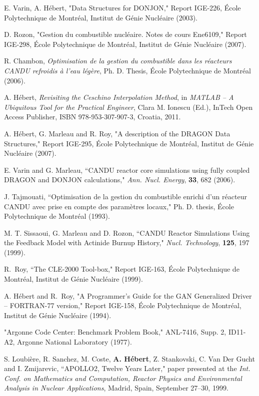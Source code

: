 \begin{thebibliography}{99}
E. Varin, A. H\'ebert,
"Data Structures for DONJON," 
Report IGE-226, \'Ecole Polytechnique de Montr\'eal,
 Institut de G\'enie Nucl\'eaire (2003).

D. Rozon, 
"Gestion du combustible nucl\'eaire. Notes de cours Ene6109,"
Report IGE-298, \'Ecole Polytechnique de Montr\'eal,
 Institut de G\'enie Nucl\'eaire (2007).

R. Chambon,
{\sl Optimisation de la gestion du combustible dans les r\'eacteurs
CANDU refroidis \`a l'eau l\'eg\`ere}, Ph. D. Thesis, \'Ecole Polytechnique de Montr\'eal (2006). 

A. H\'ebert, {\sl Revisiting the Ceschino Interpolation Method}, in {\sl MATLAB -- A Ubiquitous Tool for the Practical
Engineer}, Clara M. Ionescu (Ed.), InTech Open Access Publisher, ISBN 978-953-307-907-3, Croatia, 2011.

A. H\'ebert, G. Marleau and R. Roy, 
"A description of the DRAGON Data Structures," 
Report IGE-295, \'Ecole Polytechnique de Montr\'eal,
 Institut de G\'enie Nucl\'eaire (2007).

E. Varin and G. Marleau, ``CANDU reactor core simulations using fully coupled DRAGON and DONJON calculations,"
{\sl Ann. Nucl. Energy}, {\bf 33}, 682 (2006).

J. Tajmouati, ``Optimisation de la gestion du combustible enrichi d'un r\'eacteur CANDU
avec prise en compte des param\`etres locaux," Ph. D. thesis, \'Ecole Polytechnique de
Montr\'eal (1993).

M. T. Sissaoui, G. Marleau and D. Rozon, ``CANDU Reactor Simulations Using the
Feedback Model with Actinide Burnup History," {\sl Nucl. Technology}, {\bf 125},
197 (1999).

R.~Roy, ``The CLE-2000 Tool-box," 
Report IGE-163, \'Ecole Polytechnique de Montr\'eal,
 Institut de G\'enie Nucl\'eaire (1999).

A. H\'ebert and R.~Roy, "A Programmer's Guide for the GAN Generalized Driver --
FORTRAN-77 version," Report IGE-158, \'Ecole Polytechnique de Montr\'eal,
Institut de G\'enie Nucl\'eaire (1994).

"Argonne Code Center: Benchmark Problem Book," ANL-7416, Supp. 2, ID11-A2, 
Argonne National Laboratory (1977).

S. Loubi\`ere, R. Sanchez, M. Coste, {\bf A. H\'ebert}, Z. Stankovski, C. Van Der Gucht and I. Zmijarevic, ``APOLLO2,
Twelve Years Later," paper presented at the {\sl Int. Conf. on Mathematics and Computation,
Reactor Physics and Environmental Analysis in Nuclear Applications}, Madrid, Spain, September 27--30, 1999.


\end{thebibliography}
